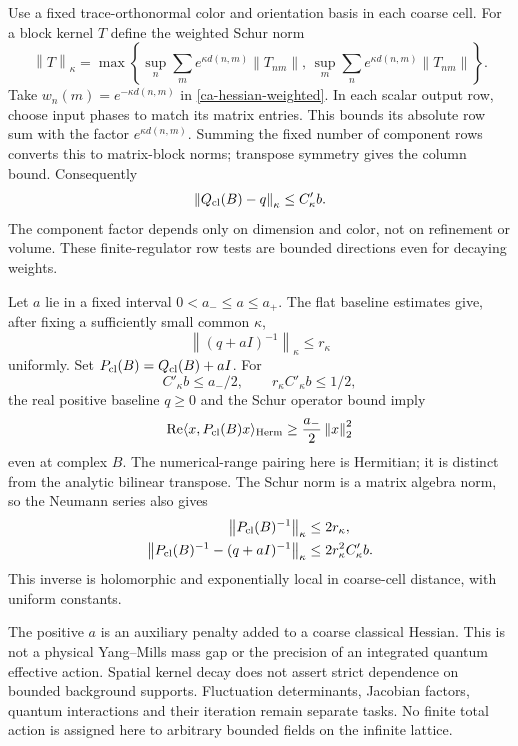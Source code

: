 \documentclass[11pt]{article}
\theoremstyle{remark}
\newcommand{\norm}[1]{\left\|#1\right\|}
\begin{document}
Use a fixed trace-orthonormal color and orientation basis in
each coarse cell. For a block kernel $T$ define the weighted
Schur norm
\begin{equation}\label{ca-schur}
 \norm T_\kappa=\max\left\{
   \sup_n\sum_m e^{\kappa d(n,m)}\norm{T_{nm}},\,
   \sup_m\sum_n e^{\kappa d(n,m)}\norm{T_{nm}}\right\}.
\end{equation}
Take $w_n(m)=e^{-\kappa d(n,m)}$ in
\eqref{ca-hessian-weighted}. In each scalar output row,
choose input phases to match its matrix entries. This bounds
its absolute row sum with the factor $e^{\kappa d(n,m)}$.
Summing the fixed number of component rows converts this to
matrix-block norms; transpose symmetry gives the column bound.
Consequently
\begin{equation}\label{ca-hessian-schur}
 \norm{Q_{\rm cl}(B)-q}_\kappa\le C'_{\kappa}b.
\end{equation}
The component factor depends only on dimension and color,
not on refinement or volume. These finite-regulator row tests
are bounded directions even for decaying weights.

Let $a$ lie in a fixed interval $0<a_-\le a\le a_+$.
The flat baseline estimates give, after fixing a sufficiently
small common $\kappa$,
\begin{equation}\label{ca-baseline-inverse}
 \norm{(q+aI)^{-1}}_\kappa\le r_\kappa
\end{equation}
uniformly. Set $P_{\rm cl}(B)=Q_{\rm cl}(B)+aI$.
For
\begin{equation}\label{ca-inverse-radius}
 C'_\kappa b\le a_-/2,\qquad
 r_\kappa C'_\kappa b\le1/2,
\end{equation}
the real positive baseline $q\ge0$ and the Schur operator
bound imply
\begin{equation}\label{ca-accretivity}
 \operatorname{Re}\langle x,P_{\rm cl}(B)x\rangle_{\rm Herm}
                 \ge\frac{a_-}{2}\norm x_2^2
\end{equation}
even at complex $B$. The numerical-range pairing here is
Hermitian; it is distinct from the analytic bilinear transpose.
The Schur norm is a matrix algebra norm, so the Neumann series
also gives
\begin{equation}\label{ca-inverse-bounds}
 \begin{split}
 \norm{P_{\rm cl}(B)^{-1}}_\kappa&\le2r_\kappa,\\
 \norm{P_{\rm cl}(B)^{-1}-(q+aI)^{-1}}_\kappa
                         &\le2r_\kappa^2C'_\kappa b.
 \end{split}
\end{equation}
This inverse is holomorphic and exponentially local in
coarse-cell distance, with uniform constants.

The positive $a$ is an auxiliary penalty added to a coarse
classical Hessian. This is not a physical Yang--Mills mass gap
or the precision of an integrated quantum effective action.
Spatial kernel decay does not assert strict dependence on
bounded background supports. Fluctuation determinants,
Jacobian factors, quantum interactions and their iteration
remain separate tasks. No finite total action is assigned
here to arbitrary bounded fields on the infinite lattice.
\end{document}
